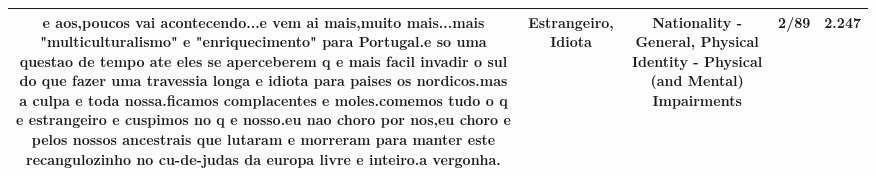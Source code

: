 \documentclass[11pt]{article}
\newlength\mylength
\begin{document}
\begin{center}
\begin{longtable}{|C{.65\mylength}|C{.30\mylength}|C{.12\mylength}|C{.12\mylength}|C{.12\mylength}|}
  \small e aos,poucos vai acontecendo...e vem ai mais,muito mais...mais "multiculturalismo" e "enriquecimento" para Portugal.e so uma questao de tempo ate eles se aperceberem q e mais facil invadir o sul do que fazer uma travessia longa e \textbf{idiota} para paises os nordicos.mas a culpa e toda nossa.ficamos complacentes e moles.comemos tudo o q e \textbf{estrangeiro} e cuspimos no q e nosso.eu nao choro por nos,eu choro e pelos nossos ancestrais que lutaram e morreram para manter este recangulozinho no cu-de-judas da europa livre e inteiro.a vergonha.\normalsize   & Estrangeiro, Idiota & Nationality - General, Physical Identity - Physical (and Mental) Impairments & 2/89 & 2.247 \\  \hline
  
\end{longtable}
\end{center}
\end{document}
